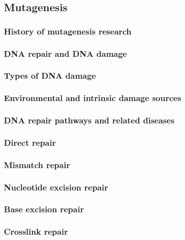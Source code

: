 
\pagestyle{empty}
\subsection{Mutagenesis}

\subsubsection{History of mutagenesis research}

\subsubsection{DNA repair and DNA damage}

\subsubsection*{Types of DNA damage}

\subsubsection*{Environmental and intrinsic damage sources}

\subsubsection{DNA repair pathways and related diseases}

\subsubsection*{Direct repair}

\subsubsection*{Mismatch repair}

\subsubsection*{Nucleotide excision repair}

\subsubsection*{Base excision repair}

\subsubsection*{Crosslink repair}

